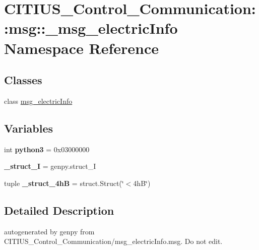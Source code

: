 \hypertarget{namespace_c_i_t_i_u_s___control___communication_1_1msg_1_1__msg__electric_info}{\section{\-C\-I\-T\-I\-U\-S\-\_\-\-Control\-\_\-\-Communication\-:\-:msg\-:\-:\-\_\-msg\-\_\-electric\-Info \-Namespace \-Reference}
\label{namespace_c_i_t_i_u_s___control___communication_1_1msg_1_1__msg__electric_info}
}
\subsection*{\-Classes}
\begin{DoxyCompactItemize}
\item 
class \hyperlink{class_c_i_t_i_u_s___control___communication_1_1msg_1_1__msg__electric_info_1_1msg__electric_info}{msg\-\_\-electric\-Info}
\end{DoxyCompactItemize}
\subsection*{\-Variables}
\begin{DoxyCompactItemize}
\item 
\hypertarget{namespace_c_i_t_i_u_s___control___communication_1_1msg_1_1__msg__electric_info_af6dfd60b99f08bd64357c2b178407f4f}{int {\bfseries python3} = 0x03000000}\label{namespace_c_i_t_i_u_s___control___communication_1_1msg_1_1__msg__electric_info_af6dfd60b99f08bd64357c2b178407f4f}

\item 
\hypertarget{namespace_c_i_t_i_u_s___control___communication_1_1msg_1_1__msg__electric_info_ae4914218a766c573594559ae07114f49}{{\bfseries \-\_\-struct\-\_\-\-I} = genpy.\-struct\-\_\-\-I}\label{namespace_c_i_t_i_u_s___control___communication_1_1msg_1_1__msg__electric_info_ae4914218a766c573594559ae07114f49}

\item 
\hypertarget{namespace_c_i_t_i_u_s___control___communication_1_1msg_1_1__msg__electric_info_abb797900047c052a5f07e2eb0343b98d}{tuple {\bfseries \-\_\-struct\-\_\-4h\-B} = struct.\-Struct(\char`\"{}$<$4h\-B\char`\"{})}\label{namespace_c_i_t_i_u_s___control___communication_1_1msg_1_1__msg__electric_info_abb797900047c052a5f07e2eb0343b98d}

\end{DoxyCompactItemize}


\subsection{\-Detailed \-Description}
\begin{DoxyVerb}autogenerated by genpy from CITIUS_Control_Communication/msg_electricInfo.msg. Do not edit.\end{DoxyVerb}
 